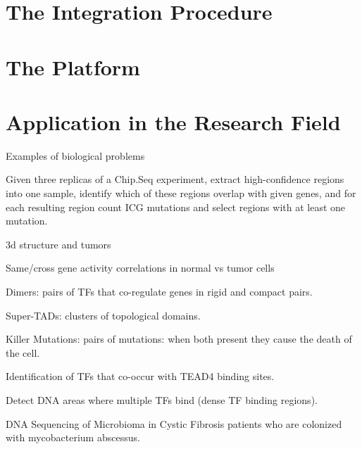 \documentclass[journal]{IEEEtran}
\begin{document}
\section{The Integration Procedure}

\section{The Platform}

\section{Application in the Research Field}

Examples of biological problems

Given three replicas of a Chip.Seq experiment, extract high-confidence regions into one sample, identify which of these regions overlap with given genes, and for each resulting region count ICG mutations and select regions with at least one mutation.

3d structure and tumors

Same/cross gene activity correlations in normal vs tumor cells

Dimers: pairs of TFs that co-regulate genes in rigid and compact pairs.

Super-TADs: clusters of topological domains.

Killer Mutations: pairs of mutations: when both present they cause the death of the cell.

Identification of TFs that co-occur with TEAD4 binding sites.

Detect DNA areas where multiple TFs bind (dense TF binding regions).

DNA Sequencing of Microbioma in Cystic Fibrosis patients who are colonized with mycobacterium abscessus.
\end{document}

